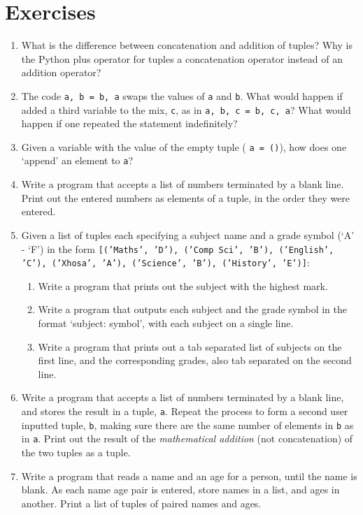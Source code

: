 \section{Exercises}
\begin{enumerate}
	\item What is the difference between concatenation and addition of    tuples? Why is the Python plus operator for tuples a concatenation    operator instead of an addition operator?
	\item The code 
\texttt{a, b = b, a} swaps the values of \texttt{a}    and \texttt{b}. What would happen if added a third variable to the    mix, \texttt{c}, as in 
\texttt{a, b, c = b, c, a}? What would    happen if one repeated the statement indefinitely?
	\item Given a variable with the value of the empty tuple (
\texttt{a =    ()}), how does one `append' an element to \texttt{a}?
	\item Write a program that accepts a list of numbers terminated by a    blank line. Print out the entered numbers as elements of a tuple, in    the order they were entered.
	\item Given a list of tuples each specifying a subject name and a    grade symbol (`A' - `F') in the form 
\texttt{[('Maths', 'D'),    ('Comp Sci', 'B'), ('English', 'C'), ('Xhosa', 'A'),    ('Science', 'B'), ('History', 'E')]}: 
\begin{enumerate}
	\item Write a program that prints out the subject with the highest     mark.
	\item Write a program that outputs each subject and the grade     symbol in the format `subject: symbol', with each subject on a     single line.
	\item Write a program that prints out a tab separated list of     subjects on the first line, and the corresponding grades, also     tab separated on the second line.
\end{enumerate}
	\item Write a program that accepts a list of numbers terminated by a    blank line, and stores the result in a tuple, \texttt{a}. Repeat the    process to form a second user inputted tuple, \texttt{b}, making    sure there are the same number of elements in \texttt{b} as in    \texttt{a}. Print out the result of the \textit{mathematical    addition} (not concatenation) of the two tuples as a    tuple.
	\item Write a program that reads a name and an age for a person, until    the name is blank. As each name age pair is entered, store names in    a list, and ages in another. Print a list of tuples of paired names    and ages.

\end{enumerate}
